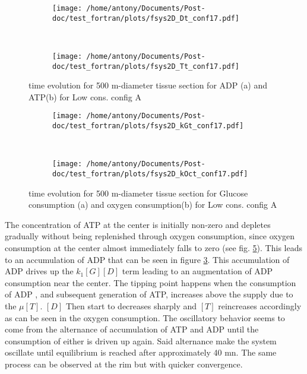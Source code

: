 \documentclass[11pt,a4paper]{article}
\begin{document}
\begin{figure}[ht!]
	\begin{subfigure}{0.45\textwidth}
	\centering
	\texttt{[image: /home/antony/Documents/Post-doc/test\_fortran/plots/fsys2D\_Dt\_conf17.pdf]}
	\caption{ \label{Dt_conf17}}
	\end{subfigure}
	~~
	\begin{subfigure}{0.45\textwidth}
	\texttt{[image: /home/antony/Documents/Post-doc/test\_fortran/plots/fsys2D\_Tt\_conf17.pdf]}
		\caption{ \label{Tt_conf17}}
	\end{subfigure}
	\caption{time evolution for 500 \textmu m-diameter tissue section  for ADP (a) and ATP(b) for Low cons. config A  \label{DTtconf17}}
\end{figure} 

\begin{figure}[ht!]
	\begin{subfigure}{0.45\textwidth}
	\centering
	\texttt{[image: /home/antony/Documents/Post-doc/test\_fortran/plots/fsys2D\_kGt\_conf17.pdf]}
	\caption{ \label{kGt_conf17}}
	\end{subfigure}
	~~
	\begin{subfigure}{0.45\textwidth}
	\texttt{[image: /home/antony/Documents/Post-doc/test\_fortran/plots/fsys2D\_kOct\_conf17.pdf]}
		\caption{ \label{kOct_conf17}}
	\end{subfigure}
	\caption{time evolution for 500 \textmu m-diameter tissue section  for Glucose consumption (a) and oxygen consumption(b) for Low cons. config A \label{ktconf17}}
\end{figure} 
  
The concentration of ATP at the center is initially non-zero and depletes gradually without being replenished through oxygen consumption, since oxygen consumption at the center almost immediately falls to zero (see fig. \ref{kOct_conf17}). This leads to an accumulation of ADP that can be seen in figure \ref{DTtconf17}. This accumulation of ADP drives up the $k_{1}[G][D]$ term leading to an augmentation of ADP consumption near the center. The tipping point happens when the consumption of ADP , and subsequent generation of ATP, increases above the supply due to the $\mu[T]$. $[D]$ Then start to decreases sharply and $[T]$ reincreases accordingly as can be seen in the oxygen consumption.
The oscillatory behavior seems to come from the alternance of accumulation of ATP and ADP until the consumption of either is driven up again. Said alternance make the system oscillate until equilibrium is reached after approximately 40 mn. The same process can be observed at the rim but with quicker convergence.
\end{document}
